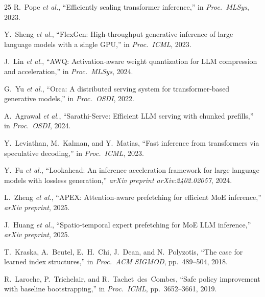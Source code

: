 \documentclass[conference]{IEEEtran}
\begin{document}
\begin{thebibliography}{25}
R.~Pope \emph{et al.},
``Efficiently scaling transformer inference,''
in \emph{Proc.\ MLSys}, 2023.

Y.~Sheng \emph{et al.},
``{FlexGen}: High-throughput generative inference of large language models with a single {GPU},''
in \emph{Proc.\ ICML}, 2023.

J.~Lin \emph{et al.},
``{AWQ}: Activation-aware weight quantization for {LLM} compression and acceleration,''
in \emph{Proc.\ MLSys}, 2024.

G.~Yu \emph{et al.},
``{Orca}: A distributed serving system for transformer-based generative models,''
in \emph{Proc.\ OSDI}, 2022.

A.~Agrawal \emph{et al.},
``{Sarathi-Serve}: Efficient {LLM} serving with chunked prefills,''
in \emph{Proc.\ OSDI}, 2024.

Y.~Leviathan, M.~Kalman, and Y.~Matias,
``Fast inference from transformers via speculative decoding,''
in \emph{Proc.\ ICML}, 2023.

Y.~Fu \emph{et al.},
``Lookahead: An inference acceleration framework for large language models with lossless generation,''
\emph{arXiv preprint arXiv:2402.02057}, 2024.

L.~Zheng \emph{et al.},
``{APEX}: Attention-aware prefetching for efficient {MoE} inference,''
\emph{arXiv preprint}, 2025.

J.~Huang \emph{et al.},
``Spatio-temporal expert prefetching for {MoE} {LLM} inference,''
\emph{arXiv preprint}, 2025.

T.~Kraska, A.~Beutel, E.~H.~Chi, J.~Dean, and N.~Polyzotis,
``The case for learned index structures,''
in \emph{Proc.\ ACM SIGMOD}, pp.~489--504, 2018.

R.~Laroche, P.~Trichelair, and R.~Tachet~des~Combes,
``Safe policy improvement with baseline bootstrapping,''
in \emph{Proc.\ ICML}, pp.~3652--3661, 2019.

\end{thebibliography}
\end{document}
